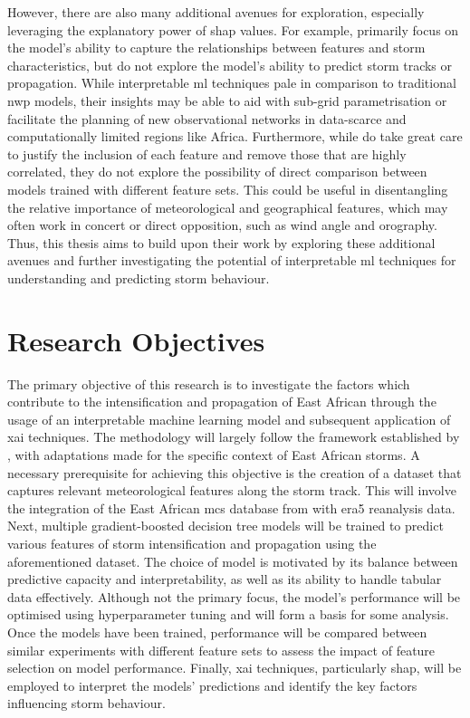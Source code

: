 However, there are also many additional avenues for exploration, especially leveraging the explanatory power of \acrshort{shap} values. For example, \cite{Hunt2024} primarily focus on the model's ability to capture the relationships between features and storm characteristics, but do not explore the model's ability to predict storm tracks or propagation. While interpretable \acrshort{ml} techniques pale in comparison to traditional \acrfull{nwp} models, their insights may be able to aid with sub-grid parametrisation or facilitate the planning of new observational networks in data-scarce and computationally limited regions like Africa. Furthermore, while \cite{Hunt2024} do take great care to justify the inclusion of each feature and remove those that are highly correlated, they do not explore the possibility of direct comparison between models trained with different feature sets. This could be useful in disentangling the relative importance of meteorological and geographical features, which may often work in concert or direct opposition, such as wind angle and orography. Thus, this thesis aims to build upon their work by exploring these additional avenues and further investigating the potential of interpretable \acrshort{ml} techniques for understanding and predicting storm behaviour.

\section{Research Objectives}

The primary objective of this research is to investigate the factors which contribute to the intensification and propagation of East African  through the usage of an interpretable machine learning model and subsequent application of \acrshort{xai} techniques. The methodology will largely follow the framework established by \cite{Hunt2024}, with adaptations made for the specific context of East African storms. A necessary prerequisite for achieving this objective is the creation of a dataset that captures relevant meteorological features along the storm track. This will involve the integration of the East African \acrshort{mcs} database from \cite{Hill2023} with \acrshort{era5} reanalysis data. Next, multiple gradient-boosted decision tree models will be trained to predict various features of storm intensification and propagation using the aforementioned dataset. The choice of model is motivated by its balance between predictive capacity and interpretability, as well as its ability to handle tabular data effectively. Although not the primary focus, the model's performance will be optimised using hyperparameter tuning and will form a basis for some analysis. Once the models have been trained, performance will be compared between similar experiments with different feature sets to assess the impact of feature selection on model performance. Finally, \acrshort{xai} techniques, particularly \acrshort{shap}, will be employed to interpret the models' predictions and identify the key factors influencing storm behaviour.

